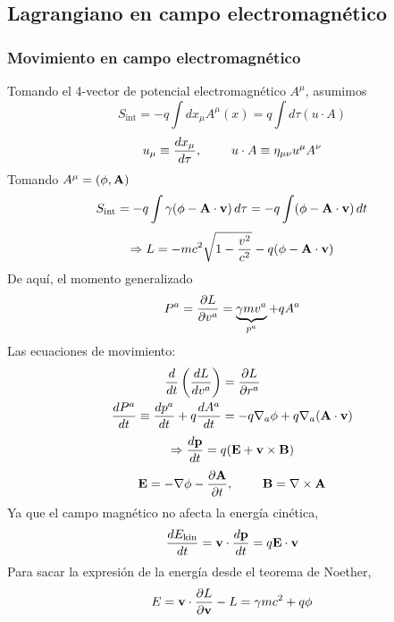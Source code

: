 \documentclass[]{article}
\numberwithin{equation}{section}
\begin{document}
\subsection{Lagrangiano en campo electromagnético}
\subsubsection{Movimiento en campo electromagnético}
Tomando el 4-vector de potencial electromagnético \(A^\mu\), asumimos
\begin{equation}
	S_\mathrm{int} = -q \int dx_\mu A^\mu (x) = q \int d\tau (u\cdot A)
\end{equation}
\begin{equation*}
	u_\mu \equiv \dfrac{d x_\mu}{d \tau}, ~~~~~~~ u \cdot A \equiv \eta_{\mu\nu} u^\mu A^\nu
\end{equation*}
Tomando \(A^\mu = (\phi,\mathbf{A})\)
\begin{equation*}
	S_\mathrm{int} = -q \int \gamma(\phi - \mathbf{A}\cdot\mathbf{v}) \, d\tau = -q \int (\phi - \mathbf{A}\cdot\mathbf{v}) \, dt
\end{equation*}
\begin{equation}
	\Rightarrow L = -mc^2 \sqrt{1 - \frac{v^2}{c^2}} - q(\phi - \mathbf{A}\cdot\mathbf{v})
\end{equation}
De aquí, el momento generalizado
\begin{equation}
	P^{a} = \dfrac{\partial L}{\partial v^{a}} = \underbrace{\gamma m v^a}_{p^a} + q A^{a}
\end{equation}
Las ecuaciones de movimiento:
\begin{align}
	\dfrac{d }{d t}\left(\dfrac{d L}{d v^a}\right) &= \dfrac{\partial L}{\partial r^a}\nonumber\\
	\dfrac{d P^a}{d t} \equiv \dfrac{d p^a}{d t} + q\dfrac{d A^a}{d t} & = -q\nabla_a \phi + q\nabla_a (\mathbf{A}\cdot\mathbf{v})
\end{align}
\begin{equation}
	\Rightarrow\dfrac{d \mathbf{p}}{d t} = q(\mathbf{E} + \mathbf{v}\times\mathbf{B})
\end{equation}
\begin{equation}
	\mathbf{E} = - \nabla\phi - \dfrac{\partial \mathbf{A}}{\partial t}, ~~~~~~~ \mathbf{B} = \nabla\times\mathbf{A}
\end{equation}
Ya que el campo magnético no afecta la energía cinética,
\begin{equation}
	\dfrac{d E_\mathrm{kin}}{d t} = \mathbf{v}\cdot\dfrac{d \mathbf{p}}{d t} = q\mathbf{E}\cdot\mathbf{v}
\end{equation}
Para sacar la expresión de la energía desde el teorema de Noether,
\begin{equation}
	E = \mathbf{v}\cdot\dfrac{\partial L}{\partial \mathbf{v}} - L = \gamma mc^2 + q\phi
\end{equation}
\end{document}
